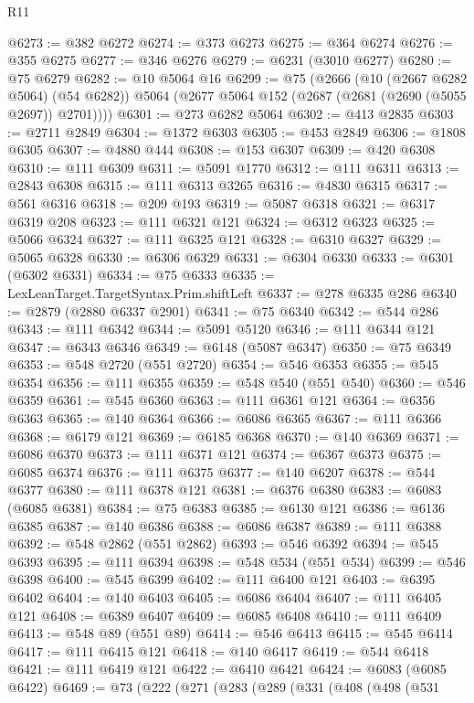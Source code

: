 \begin{lexlean}{R11}
\begin{coremodule}
{{{{{{{{{{{{{{{{{{{{{{{{{{{{{{{{{{{{{{{{{{{{{{{{{{{{{{{{{{{{{{{{{{{{{{{{{{{{{{{{{{@6273 := @382 @6272
@6274 := @373 @6273
@6275 := @364 @6274
@6276 := @355 @6275
@6277 := @346 @6276
@6279 := @6231 (@3010 @6277)
@6280 := @75 @6279
@6282 := @10 @5064 @16
@6299 := @75
    (@2666
      (@10 (@2667 @6282 @5064) (@54 @6282))
      @5064
      (@2677 @5064 @152 (@2687 (@2681 (@2690 (@5055 @2697)) @2701))))
@6301 := @273 @6282 @5064
@6302 := @413 @2835
@6303 := @2711 @2849
@6304 := @1372 @6303
@6305 := @453 @2849
@6306 := @1808 @6305
@6307 := @4880 @444
@6308 := @153 @6307
@6309 := @420 @6308
@6310 := @111 @6309
@6311 := @5091 @1770
@6312 := @111 @6311
@6313 := @2843 @6308
@6315 := @111 @6313 @3265
@6316 := @4830 @6315
@6317 := @561 @6316
@6318 := @209 @193
@6319 := @5087 @6318
@6321 := @6317 @6319 @208
@6323 := @111 @6321 @121
@6324 := @6312 @6323
@6325 := @5066 @6324
@6327 := @111 @6325 @121
@6328 := @6310 @6327
@6329 := @5065 @6328
@6330 := @6306 @6329
@6331 := @6304 @6330
@6333 := @6301 (@6302 @6331)
@6334 := @75 @6333
@6335 := LexLeanTarget.TargetSyntax.Prim.shiftLeft
@6337 := @278 @6335 @286
@6340 := @2879 (@2880 @6337 @2901)
@6341 := @75 @6340
@6342 := @544 @286
@6343 := @111 @6342
@6344 := @5091 @5120
@6346 := @111 @6344 @121
@6347 := @6343 @6346
@6349 := @6148 (@5087 @6347)
@6350 := @75 @6349
@6353 := @548 @2720 (@551 @2720)
@6354 := @546 @6353
@6355 := @545 @6354
@6356 := @111 @6355
@6359 := @548 @540 (@551 @540)
@6360 := @546 @6359
@6361 := @545 @6360
@6363 := @111 @6361 @121
@6364 := @6356 @6363
@6365 := @140 @6364
@6366 := @6086 @6365
@6367 := @111 @6366
@6368 := @6179 @121
@6369 := @6185 @6368
@6370 := @140 @6369
@6371 := @6086 @6370
@6373 := @111 @6371 @121
@6374 := @6367 @6373
@6375 := @6085 @6374
@6376 := @111 @6375
@6377 := @140 @6207
@6378 := @544 @6377
@6380 := @111 @6378 @121
@6381 := @6376 @6380
@6383 := @6083 (@6085 @6381)
@6384 := @75 @6383
@6385 := @6130 @121
@6386 := @6136 @6385
@6387 := @140 @6386
@6388 := @6086 @6387
@6389 := @111 @6388
@6392 := @548 @2862 (@551 @2862)
@6393 := @546 @6392
@6394 := @545 @6393
@6395 := @111 @6394
@6398 := @548 @534 (@551 @534)
@6399 := @546 @6398
@6400 := @545 @6399
@6402 := @111 @6400 @121
@6403 := @6395 @6402
@6404 := @140 @6403
@6405 := @6086 @6404
@6407 := @111 @6405 @121
@6408 := @6389 @6407
@6409 := @6085 @6408
@6410 := @111 @6409
@6413 := @548 @89 (@551 @89)
@6414 := @546 @6413
@6415 := @545 @6414
@6417 := @111 @6415 @121
@6418 := @140 @6417
@6419 := @544 @6418
@6421 := @111 @6419 @121
@6422 := @6410 @6421
@6424 := @6083 (@6085 @6422)
@6469 := @73
    (@222
      (@271
        (@283
          (@289
            (@331
              (@408
                (@498
                  (@531
}}}}}}}}}}}}}}}}}}}}}}}}}}}}}}}}}}}}}}}}}}}}}}}}}}}}}}}}}}}}}}}}}}}}}}}}}}}}}}}}}}
\end{coremodule}
\end{lexlean}
